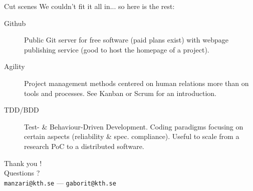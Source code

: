 \documentclass[10pt]{beamer}
\begin{document}
\begin{frame}{Cut scenes}
  We couldn't fit it all in... so here is the rest:

  \begin{description}
  \item[Github] Public Git server for free software (paid plans exist)
    with webpage publishing service (good to host the homepage of a project).
  \item[Agility] Project management methods centered on human relations more than on
    tools and processes. See Kanban or Scrum for an introduction.
  \item[TDD/BDD] Test- \& Behaviour-Driven Development. Coding paradigms focusing
    on certain aspects (reliability \& spec. compliance). Useful to scale from a
    research PoC to a distributed software.
  \end{description}
\end{frame}


\begin{frame}[standout] %
  Thank you !\\
  \vspace{0.05\textwidth}
  Questions ?\\
  \vspace{0.25\textwidth}
  \scriptsize{\texttt{manzari@kth.se}} --- \scriptsize{\texttt{gaborit@kth.se}}\\
\end{frame}

\end{document}
